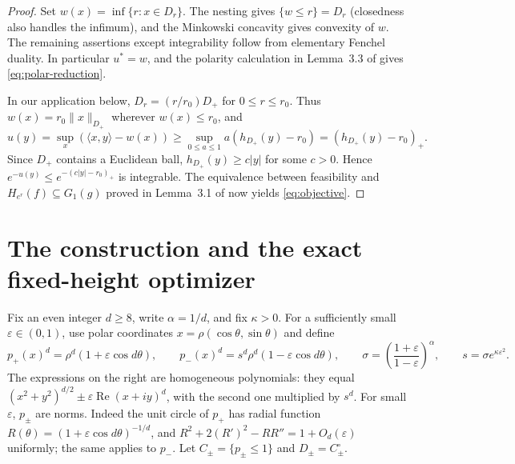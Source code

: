 \documentclass[11pt]{article}
\newcommand{\eps}{\varepsilon}
\begin{document}
\begin{proof}
Set $w(x)=\inf\{r:x\in D_r\}$.  The nesting gives
$\{w\leq r\}=D_r$ (closedness also handles the infimum), and the Minkowski
concavity gives convexity of $w$.  The remaining assertions except
integrability follow from elementary Fenchel duality.  In particular
$u^*=w$, and the polarity calculation in Lemma~3.3 of \cite{AGMV} gives
\eqref{eq:polar-reduction}.

In our application below, $D_r=(r/r_0)D_+$ for $0\leq r\leq r_0$.  Thus
$w(x)=r_0\|x\|_{D_+}$ wherever $w(x)\leq r_0$, and
\[
 u(y)=\sup_x(\langle x,y\rangle-w(x))
 \geq \sup_{0\leq a\leq1}a(h_{D_+}(y)-r_0)
 =(h_{D_+}(y)-r_0)_+.
\]
Since $D_+$ contains a Euclidean ball, $h_{D_+}(y)\geq c|y|$ for some
$c>0$.  Hence $e^{-u(y)}\leq e^{-(c|y|-r_0)_+}$ is integrable.
The equivalence between feasibility and $H_{e^r}(f)\subseteq G_1(g)$ proved
in Lemma~3.1 of \cite{AGMV} now yields \eqref{eq:objective}.
\end{proof}

\section{The construction and the exact fixed-height optimizer}

Fix an even integer $d\geq8$, write $\alpha=1/d$, and fix $\kappa>0$.  For a
sufficiently small $\eps\in(0,1)$, use polar coordinates
$x=\rho(\cos\theta,\sin\theta)$
and define
\[
 p_+(x)^d=\rho^d(1+\eps\cos d\theta),\qquad
 p_-(x)^d=s^d\rho^d(1-\eps\cos d\theta),
 \qquad \sigma=\left(\frac{1+\eps}{1-\eps}\right)^\alpha,\qquad
 s=\sigma e^{\kappa\eps^2}.
\]
The expressions on the right are homogeneous polynomials: they equal
$(x^2+y^2)^{d/2}\pm\eps\operatorname{Re}(x+iy)^d$, with the second one
multiplied by $s^d$.  For small $\eps$, $p_\pm$ are norms.  Indeed the unit
circle of $p_+$ has radial function
$R(\theta)=(1+\eps\cos d\theta)^{-1/d}$, and
$R^2+2(R')^2-RR''=1+O_d(\eps)$ uniformly; the same applies to $p_-$.  Let
$C_\pm=\{p_\pm\leq1\}$ and $D_\pm=C_\pm^\circ$.
\end{document}
